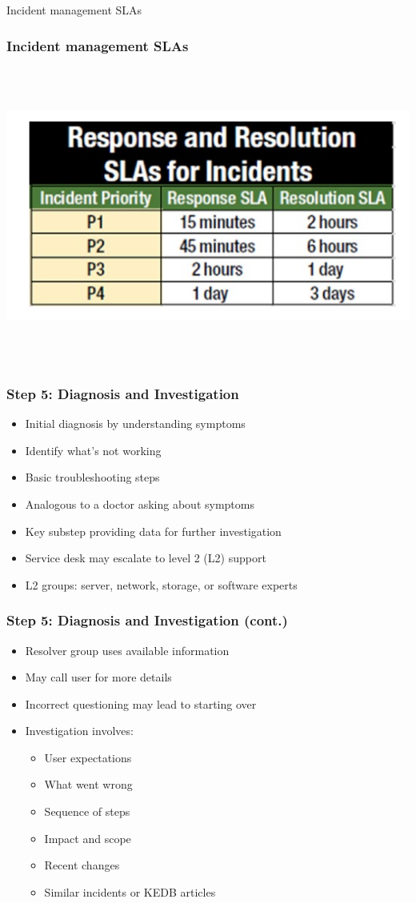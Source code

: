 \documentclass[aspectratio=169, table]{beamer}
\begin{document}
\begin{frame}{Incident management SLAs} 	 \frametitle{ Incident management SLAs} \begin{center} 	\includegraphics[width=0.8\linewidth]{images/image-03.png} \end{center} \end{frame}

\begin{frame}
	\frametitle{Step 5: Diagnosis and Investigation}
	\begin{itemize}
		\item Initial diagnosis by understanding symptoms
		\item Identify what's not working
		\item Basic troubleshooting steps
		\item Analogous to a doctor asking about symptoms
		\item Key substep providing data for further investigation
		\item Service desk may escalate to level 2 (L2) support
		\item L2 groups: server, network, storage, or software experts
	\end{itemize}
\end{frame}

\begin{frame}
	\frametitle{Step 5: Diagnosis and Investigation (cont.)}
	\begin{itemize}
		\item Resolver group uses available information
		\item May call user for more details
		\item Incorrect questioning may lead to starting over
		\item Investigation involves:
		\begin{itemize}
			\item User expectations
			\item What went wrong
			\item Sequence of steps
			\item Impact and scope
			\item Recent changes
			\item Similar incidents or KEDB articles
		\end{itemize}
	\end{itemize}
\end{frame}
\end{document}
